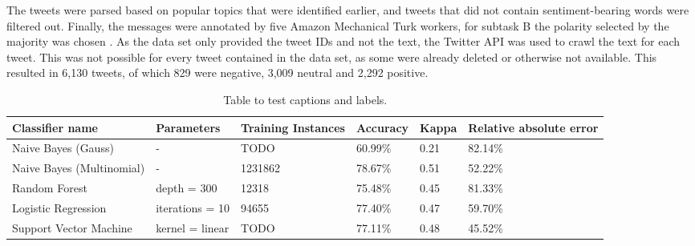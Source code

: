 The tweets were parsed based on popular topics that were identified earlier, and tweets that did not contain sentiment-bearing words were filtered out. Finally, the messages were annotated by five Amazon Mechanical Turk workers, for subtask B the polarity selected by the majority was chosen \cite{nakov-etal-2013-semeval}. As the data set only provided the tweet IDs and not the text, the Twitter API was used to crawl the text for each tweet. This was not possible for every tweet contained in the data set, as some were already deleted or otherwise not available. This resulted in 6,130 tweets, of which 829 were negative, 3,009 neutral and 2,292 positive.


\begin{table}[h!]
\centering
\caption{Table to test captions and labels.}
\begin{tabular}{ |p{3cm}||p{3cm}|p{2cm}|p{2cm}|p{2cm}|p{2cm}|  }
 \hline
 Classifier name &          Parameters &             Training Instances &    Accuracy &      Kappa &     Relative absolute error \\
 \hline
 Naive Bayes (Gauss)        &-&            TODO&                 60.99\%&        0.21&       82.14\%\\
  \hline
 Naive Bayes (Multinomial)  &-&                     1231862&                78.67\%&        0.51&       52.22\%\\
  \hline
 Random Forest              &depth = 300&            12318&                 75.48\%&        0.45&       81.33\%\\
  \hline
 Logistic Regression        &iterations = 10&            94655&                 77.40\%&        0.47&       59.70\%\\
  \hline
 Support Vector Machine     &kernel = linear&            TODO&                 77.11\%&        0.48&       45.52\%\\
 \hline
\end{tabular}
\label{tab:evaluations}
\end{table}